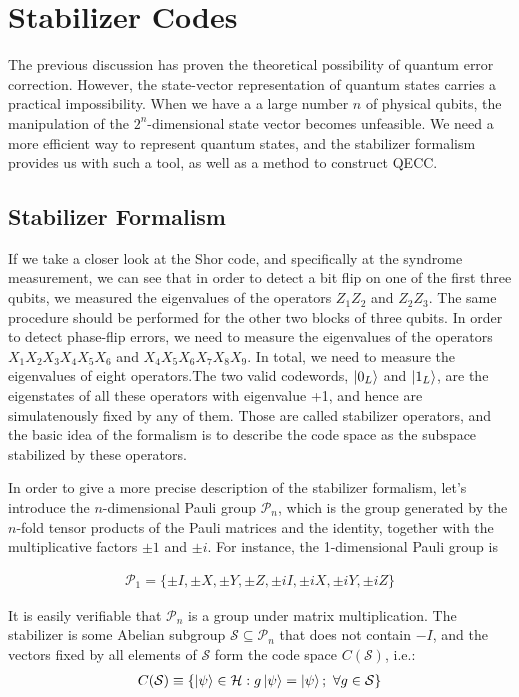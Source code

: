 \documentclass[12pt, twoside, openany]{book}
\begin{document}
\section{Stabilizer Codes}

The previous discussion has proven the theoretical possibility of quantum error correction. However, the state-vector representation of quantum states carries a practical impossibility. When we have a a large number $n$ of physical qubits, the manipulation of the $2^n$-dimensional state vector becomes unfeasible. We need a more efficient way to represent quantum states, and the stabilizer formalism provides us with such a tool, as well as a method to construct QECC. \\

\subsection{Stabilizer Formalism}

If we take a closer look at the Shor code, and specifically at the syndrome measurement, we can see that in order to detect a bit flip on one of the first three qubits, we measured the eigenvalues of the operators $Z_1 Z_2$ and $Z_2 Z_3$. The same procedure should be performed for the other two blocks of three qubits. In order to detect phase-flip errors, we need to measure the eigenvalues of the operators $X_1 X_2 X_3 X_4 X_5 X_6$ and $X_4 X_5 X_6 X_7 X_8 X_9$. In total, we need to measure the eigenvalues of eight operators.The two valid codewords, $\ket{0_L}$ and $\ket{1_L}$, are the eigenstates of all these operators with eigenvalue +1, and hence are simulatenously fixed by any of them. Those are called stabilizer operators, and the basic idea of the formalism is to describe the code space as the subspace stabilized by these operators. 

In order to give a more precise description of the stabilizer formalism, let's introduce the $n$-dimensional Pauli group $\mathcal{P}_n$, which is the group generated by the $n$-fold tensor products of the Pauli matrices and the identity, together with the multiplicative factors $\pm 1$ and $\pm i$. For instance, the 1-dimensional Pauli group is 

\begin{align*}
    \mathcal{P}_1 = \{ \pm I, \pm X, \pm Y, \pm Z, \pm iI, \pm iX, \pm iY, \pm iZ  \}
\end{align*}

It is easily verifiable that $\mathcal{P}_n$ is a group under matrix multiplication. The stabilizer is some Abelian subgroup $\mathcal{S} \subseteq \mathcal{P}_n$ that does not contain $-I$, and the vectors fixed by all elements of $\mathcal{S}$ form the code space $C(\mathcal{S})$, i.e.:
\begin{align*}
    C(\mathcal{S}) \equiv \{ \ket{\psi} \in \mathcal{H} : g \ket{\psi} = \ket{\psi}; \ \forall g \in \mathcal{S} \}
\end{align*}
\end{document}
